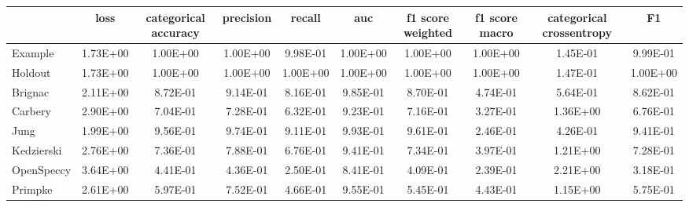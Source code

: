 \begin{tabular}{lccccccccc}
\toprule
 & loss & categorical accuracy & precision & recall & auc & f1 score weighted & f1 score macro & categorical crossentropy & F1 \\
\midrule
Example & 1.73E+00 & 1.00E+00 & 1.00E+00 & 9.98E-01 & 1.00E+00 & 1.00E+00 & 1.00E+00 & 1.45E-01 & 9.99E-01 \\
Holdout & 1.73E+00 & 1.00E+00 & 1.00E+00 & 1.00E+00 & 1.00E+00 & 1.00E+00 & 1.00E+00 & 1.47E-01 & 1.00E+00 \\
Brignac & 2.11E+00 & 8.72E-01 & 9.14E-01 & 8.16E-01 & 9.85E-01 & 8.70E-01 & 4.74E-01 & 5.64E-01 & 8.62E-01 \\
Carbery & 2.90E+00 & 7.04E-01 & 7.28E-01 & 6.32E-01 & 9.23E-01 & 7.16E-01 & 3.27E-01 & 1.36E+00 & 6.76E-01 \\
Jung & 1.99E+00 & 9.56E-01 & 9.74E-01 & 9.11E-01 & 9.93E-01 & 9.61E-01 & 2.46E-01 & 4.26E-01 & 9.41E-01 \\
Kedzierski & 2.76E+00 & 7.36E-01 & 7.88E-01 & 6.76E-01 & 9.41E-01 & 7.34E-01 & 3.97E-01 & 1.21E+00 & 7.28E-01 \\
OpenSpeccy & 3.64E+00 & 4.41E-01 & 4.36E-01 & 2.50E-01 & 8.41E-01 & 4.09E-01 & 2.39E-01 & 2.21E+00 & 3.18E-01 \\
Primpke & 2.61E+00 & 5.97E-01 & 7.52E-01 & 4.66E-01 & 9.55E-01 & 5.45E-01 & 4.43E-01 & 1.15E+00 & 5.75E-01 \\
\bottomrule
\end{tabular}
